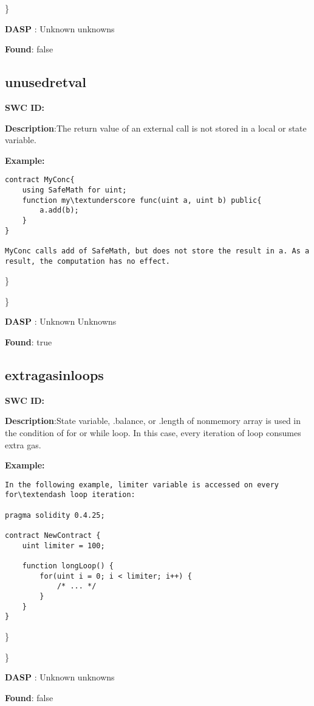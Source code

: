 \documentclass{article}
\begin{document}
\} 

\textbf{DASP} : Unknown unknowns

\textbf{Found}: false

\subsection{unused\textunderscore retval} 
\textbf{SWC \textunderscore ID:} 

\textbf{Description}:The return value of an external call is not stored in a local or state variable.


\textbf{Example:} 
\begin{verbatim}
contract MyConc{
    using SafeMath for uint;
    function my\textunderscore func(uint a, uint b) public{
        a.add(b);
    }
}

MyConc calls add of SafeMath, but does not store the result in a. As a result, the computation has no effect.

\end{verbatim}\} 

\} 

\textbf{DASP} : Unknown Unknowns

\textbf{Found}: true

\subsection{extra\textunderscore gas\textunderscore in\textunderscore loops} 
\textbf{SWC \textunderscore ID:} 

\textbf{Description}:State variable, .balance, or .length of non\textendash memory array is used in the condition of for or while loop. In this case, every iteration of loop consumes extra gas.


\textbf{Example:} 
\begin{verbatim}
In the following example, limiter variable is accessed on every for\textendash loop iteration:

pragma solidity 0.4.25;

contract NewContract {
    uint limiter = 100;

    function longLoop() {
        for(uint i = 0; i < limiter; i++) {
            /* ... */
        }
    }
}

\end{verbatim}\} 

\} 

\textbf{DASP} : Unknown unknowns

\textbf{Found}: false
\end{document}
